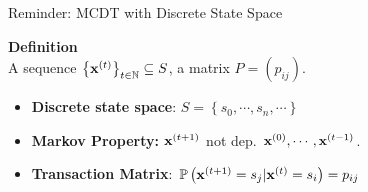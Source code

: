 \documentclass[aspectratio=169, 10pt]{beamer}
\theoremstyle{definition}
\begin{document}
\begin{frame}{Reminder: MCDT with Discrete State Space}
  \begin{minipage}[t]{0.6\textwidth}
    \textbf{Definition}\\
    A sequence $\left\{ {\mathbf{x}}^{(t)}\right\}_{t\in\mathbb{N}}
    \subseteq S$, a matrix $P=\left( p_{ij} \right)$.
    \vspace{1cm}
    \begin{itemize}
      \item \textbf{Discrete state space}: \(
        S=\left\{ s_0,\cdots,s_n,\cdots \right\}
      \) 
      \vspace{1cm}
    \item \textbf{Markov Property:} ${\mathbf{x}}^{(t+1)}$ not dep. ${\mathbf{x}}^{(0)},\cdots,{\mathbf{x}}^{(t-1)}$.
      \vspace{1cm}

    \item \textbf{Transaction Matrix}: \(
        \mathbb{P}\left( {\mathbf{x}}^{(t+1)}=s_j \vert {\mathbf{x}}^{(t)}=s_i\right)=p_{ij}
      \)
    \end{itemize}
  \end{minipage}\hfill%
\end{frame}
\end{document}
